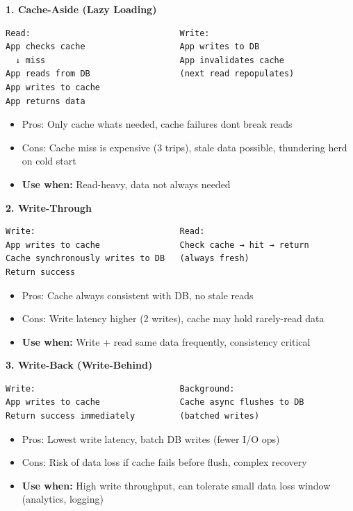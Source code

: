 \documentclass[11pt]{article}
\providecommand{\tightlist}{\setlength{\itemsep}{1pt}\setlength{\parskip}{0pt}}
\begin{document}
\textbf{1. Cache-Aside (Lazy Loading)}

\setcodelang{}

\begin{verbatim}
Read:                              Write:
App checks cache                   App writes to DB
  ↓ miss                           App invalidates cache
App reads from DB                  (next read repopulates)
App writes to cache
App returns data
\end{verbatim}

\begin{itemize}
\tightlist
\item
  Pros: Only cache what\textquotesingle s needed, cache failures don\textquotesingle t break reads
\item
  Cons: Cache miss is expensive (3 trips), stale data possible, thundering herd on cold start
\item
  \textbf{Use when:} Read-heavy, data not always needed
\end{itemize}

\textbf{2. Write-Through}

\setcodelang{}

\begin{verbatim}
Write:                             Read:
App writes to cache                Check cache → hit → return
Cache synchronously writes to DB   (always fresh)
Return success
\end{verbatim}

\begin{itemize}
\tightlist
\item
  Pros: Cache always consistent with DB, no stale reads
\item
  Cons: Write latency higher (2 writes), cache may hold rarely-read data
\item
  \textbf{Use when:} Write + read same data frequently, consistency critical
\end{itemize}

\textbf{3. Write-Back (Write-Behind)}

\setcodelang{}

\begin{verbatim}
Write:                             Background:
App writes to cache                Cache async flushes to DB
Return success immediately         (batched writes)
\end{verbatim}

\begin{itemize}
\tightlist
\item
  Pros: Lowest write latency, batch DB writes (fewer I/O ops)
\item
  Cons: Risk of data loss if cache fails before flush, complex recovery
\item
  \textbf{Use when:} High write throughput, can tolerate small data loss window (analytics, logging)
\end{itemize}
\end{document}
